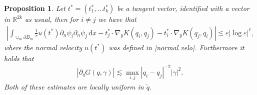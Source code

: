 \documentclass[10pt]{amsart}
\let\epsilon\varepsilon
\newtheorem{proposition}[theorem]{Proposition}
\theoremstyle{definition}
\newcommand\R{\mathbb{R}}
\newcommand\dd{\,\mathrm{d}}
\newcommand\dx{\dd x}
\let\de\partial
\let\eps\epsilon
\begin{document}
\begin{proposition}\label{crossterms G}
Let $t^*=(t_1^*,\dots t_k^*)$ be a tangent vector, identified with a vector in $\R^{2k}$ as usual, then for $i\neq j$ we have that
\begin{align*}
\left|\int_{\cup_m\de B_m}\frac{1}{r}u(t^*)\de_n\psi_i\de_n\psi_j\dx-t_j^*\cdot\nabla_yK(q_i,q_j)-t_i^*\cdot\nabla_yK(q_j,q_i)\right|\lesssim \eps|{\log\eps}|^\ell,
\end{align*}
where the normal velocity $u(t^*)$ was defined in \eqref{normal velo}. Furthermore it holds that
\begin{align*}
\left|\de_q G(q,\gamma)\right|\lesssim \max_{i,j}|q_i-q_j|^{-2}|\gamma|^2.
\end{align*}
Both of these estimates are locally uniform in $\tilde{q}$.

\end{proposition}
\end{document}

